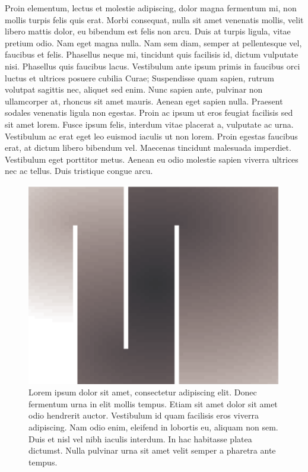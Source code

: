     Proin elementum, lectus et molestie adipiscing, dolor magna fermentum mi, non 
    mollis turpis felis quis erat. Morbi consequat, nulla sit amet venenatis mollis, 
    velit libero mattis dolor, eu bibendum est felis non arcu. Duis at turpis ligula, 
    vitae pretium odio. Nam eget magna nulla. Nam sem diam, semper at pellentesque 
    vel, faucibus et felis. Phasellus neque mi, tincidunt quis facilisis id, dictum 
    vulputate nisi. Phasellus quis faucibus lacus. Vestibulum ante ipsum primis in 
    faucibus orci luctus et ultrices posuere cubilia Curae; Suspendisse quam sapien, 
    rutrum volutpat sagittis nec, aliquet sed enim. Nunc sapien ante, pulvinar non 
    ullamcorper at, rhoncus sit amet mauris. Aenean eget sapien nulla. Praesent 
    sodales venenatis ligula non egestas. Proin ac ipsum ut eros feugiat facilisis sed 
    sit amet lorem. Fusce ipsum felis, interdum vitae placerat a, vulputate ac urna. 
    Vestibulum ac erat eget leo euismod iaculis ut non lorem. Proin egestas faucibus 
    erat, at dictum libero bibendum vel. Maecenas tincidunt malesuada imperdiet. 
    Vestibulum eget porttitor metus. Aenean eu odio molestie sapien viverra ultrices 
    nec ac tellus. Duis tristique congue arcu.

    \begin{figure}[p]
        \begin{center}
            \includegraphics{godunov-1/godunov-dist-009}
        \end{center}
        \caption[Lorem ipsum dolor sit amet, consectetur adipiscing elit.]
                {Lorem ipsum dolor sit amet, consectetur adipiscing elit. Donec fermentum 
                    urna in elit mollis tempus. Etiam sit amet dolor sit amet odio hendrerit 
                    auctor. Vestibulum id quam facilisis eros viverra adipiscing. Nam odio 
                    enim, eleifend in lobortis eu, aliquam non sem. Duis et nisl vel nibh 
                    iaculis interdum. In hac habitasse platea dictumst. Nulla pulvinar urna 
                    sit amet velit semper a pharetra ante tempus. 
                    }
        \label{fig:heaviside-regularization} 
    \end{figure}

